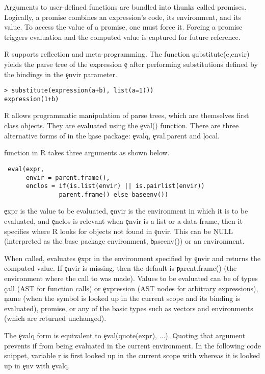 \documentclass[USenglish,cleveref, autoref, thm-restate]{lipics-v2019}
\begin{document}
Arguments to user-defined functions are bundled into thunks called
promises. Logically, a promise combines an expression's code, its
environment, and its value.  To access the value of a promise, one must
force it. Forcing a promise triggers evaluation and the computed value is
captured for future reference.


R supports reflection and meta-programming. The function \c{substitute(e,envir)}
yields the parse tree of the expression \c{e} after performing substitutions
defined by the bindings in the \c{envir} parameter.

\begin{lstlisting}
> substitute(expression(a+b), list(a=1)))  
expression(1+b)
\end{lstlisting}

\noindent
R allows programmatic manipulation of parse trees, which are themselves
first class objects. They are evaluated using the \c{eval()}
function. There are three alternative forms  of \eval in the \c{base} package:
\c{evalq}, \c{eval.parent} and \c{local}.

\eval function in R takes three arguments as shown below.
\begin{lstlisting}
 eval(expr,
      envir = parent.frame(),
      enclos = if(is.list(envir) || is.pairlist(envir))
               parent.frame() else baseenv())
\end{lstlisting}           

\c{expr} is the value to be evaluated, \c{envir}
is the environment in which it is to be evaluated, and \c{enclos} is
relevant when \c{envir} is a list or a data frame, then it specifies where R
looks for objects not found in \c{envir}. This can be \c{NULL} (interpreted
as the base package environment, \c{baseenv()}) or an environment.

When called, \eval evaluates \c{expr} in the environment specified by
\c{envir} and returns the computed value. If \c{envir} is missing, then the
default is \c{parent.frame()} (the environment where the call to \eval was
made).  Values to be evaluated can be of types \c{call} (AST for function
calls) or \c{expression} (AST nodes for arbitrary expressions), \c{name}
(when the symbol is looked up in the current scope and its binding is
evaluated), promise, or any of the basic types such as vectors and
environments (which are returned unchanged).

The \c{evalq} form is equivalent to \c{eval(quote(expr), ...)}.  Quoting
that argument prevents if from being evaluated in the current environment.
In the following code snippet, variable \c{r} is first looked up in
the current scope with \eval whereas it is looked up in \c{env} with
\c{evalq}.
\end{document}
